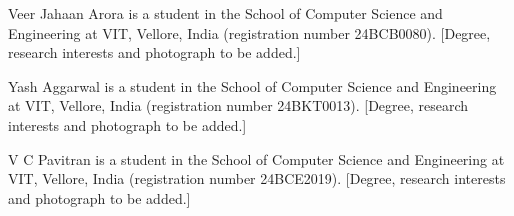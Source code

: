 \documentclass{ieeeaccess}
\begin{document}
\begin{IEEEbiographynophoto}{Veer Jahaan Arora}
is a student in the School of Computer Science and Engineering at VIT, Vellore, India (registration number 24BCB0080). [Degree, research interests and photograph to be added.]
\end{IEEEbiographynophoto}

\begin{IEEEbiographynophoto}{Yash Aggarwal}
is a student in the School of Computer Science and Engineering at VIT, Vellore, India (registration number 24BKT0013). [Degree, research interests and photograph to be added.]
\end{IEEEbiographynophoto}

\begin{IEEEbiographynophoto}{V C Pavitran}
is a student in the School of Computer Science and Engineering at VIT, Vellore, India (registration number 24BCE2019). [Degree, research interests and photograph to be added.]
\end{IEEEbiographynophoto}

\EOD
\end{document}
